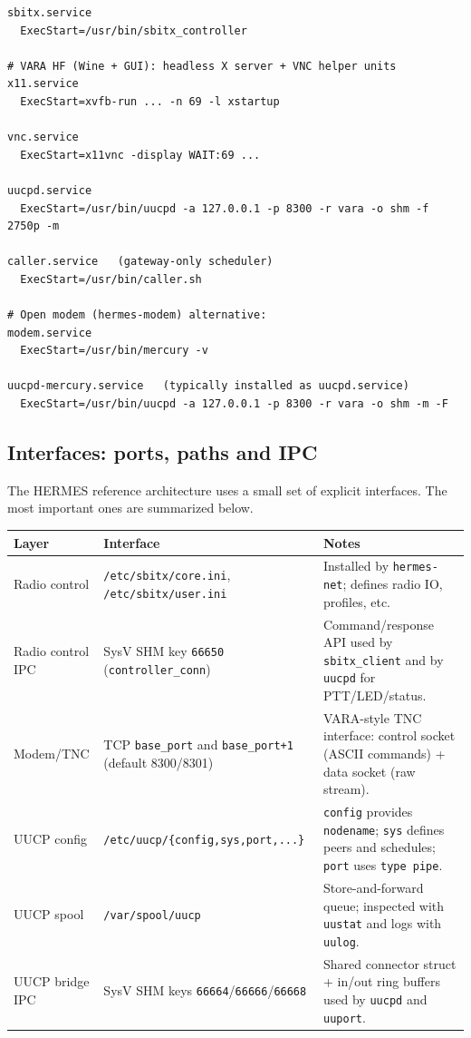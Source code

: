 \begin{verbatim}
sbitx.service
  ExecStart=/usr/bin/sbitx_controller

# VARA HF (Wine + GUI): headless X server + VNC helper units
x11.service
  ExecStart=xvfb-run ... -n 69 -l xstartup

vnc.service
  ExecStart=x11vnc -display WAIT:69 ...

uucpd.service
  ExecStart=/usr/bin/uucpd -a 127.0.0.1 -p 8300 -r vara -o shm -f 2750p -m

caller.service   (gateway-only scheduler)
  ExecStart=/usr/bin/caller.sh

# Open modem (hermes-modem) alternative:
modem.service
  ExecStart=/usr/bin/mercury -v

uucpd-mercury.service   (typically installed as uucpd.service)
  ExecStart=/usr/bin/uucpd -a 127.0.0.1 -p 8300 -r vara -o shm -m -F
\end{verbatim}

\subsection{Interfaces: ports, paths and IPC}

The HERMES reference architecture uses a small set of explicit interfaces. The most important ones are summarized below.

\begin{table}[H]
\centering
\begin{tabularx}{\textwidth}{|l|l|X|}
\hline
\textbf{Layer} & \textbf{Interface} & \textbf{Notes} \\
\hline
Radio control & \verb|/etc/sbitx/core.ini|, \verb|/etc/sbitx/user.ini| & Installed by \verb|hermes-net|; defines radio IO, profiles, etc. \\
\hline
Radio control IPC & SysV SHM key \verb|66650| (\verb|controller_conn|) & Command/response API used by \verb|sbitx_client| and by \verb|uucpd| for PTT/LED/status. \\
\hline
Modem/TNC & TCP \verb|base_port| and \verb|base_port+1| (default 8300/8301) & VARA-style TNC interface: control socket (ASCII commands) + data socket (raw stream). \\
\hline
UUCP config & \verb|/etc/uucp/{config,sys,port,...}| & \verb|config| provides \verb|nodename|; \verb|sys| defines peers and schedules; \verb|port| uses \verb|type pipe|. \\
\hline
UUCP spool & \verb|/var/spool/uucp| & Store-and-forward queue; inspected with \verb|uustat| and logs with \verb|uulog|. \\
\hline
UUCP bridge IPC & SysV SHM keys \verb|66664|/\verb|66666|/\verb|66668| & Shared connector struct + in/out ring buffers used by \verb|uucpd| and \verb|uuport|. \\
\hline
\end{tabularx}
\end{table}

